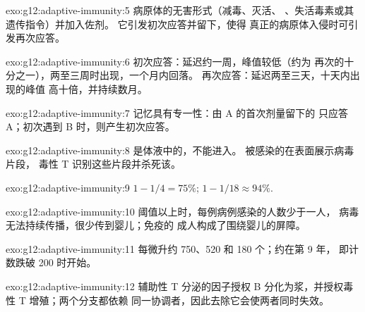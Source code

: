 \begin{solution}{exo:g12:adaptive-immunity:5}
病原体的无害形式（减毒、灭活、
、失活毒素或其遗传指令）并加入佐剂。
它引发初次应答并留下，使得
真正的病原体入侵时可引发再次应答。
\end{solution}

\begin{solution}{exo:g12:adaptive-immunity:6}
初次应答：延迟约一周，峰值较低（约为
再次的十分之一），两至三周时出现，一个月内回落。
再次应答：延迟两至三天，十天内出现的峰值
高十倍，并持续数月。
\end{solution}

\begin{solution}{exo:g12:adaptive-immunity:7}
记忆具有专一性：由 A 的首次剂量留下的
只应答 A；初次遇到 B 时，则产生初次应答。
\end{solution}

\begin{solution}{exo:g12:adaptive-immunity:8}
是体液中的，不能进入。
被感染的在表面展示病毒片段，
毒性 T 识别这些片段并杀死该。
\end{solution}

\begin{solution}{exo:g12:adaptive-immunity:9}
$1 - 1/4 = 75\%$; $1 - 1/18 \approx 94\%$.
\end{solution}

\begin{solution}{exo:g12:adaptive-immunity:10}
阈值以上时，每例病例感染的人数少于一人，
病毒无法持续传播，很少传到婴儿；免疫的
成人构成了围绕婴儿的屏障。
\end{solution}

\begin{solution}{exo:g12:adaptive-immunity:11}
每微升约 750、520 和 180 个；约在第 9 年，
即计数跌破 200 时开始。
\end{solution}

\begin{solution}{exo:g12:adaptive-immunity:12}
辅助性 T 分泌的因子授权 B 
分化为浆，并授权毒性 T 增殖；两个分支都依赖
同一协调者，因此去除它会使两者同时失效。
\end{solution}

